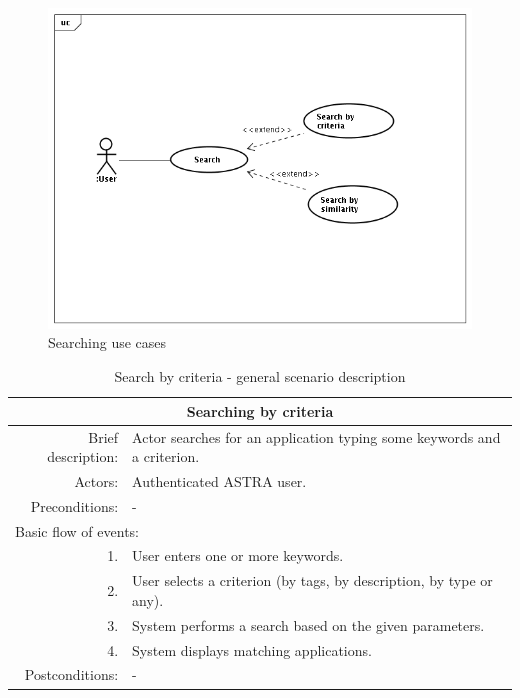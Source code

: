 \begin{figure}[h!]
 \begin{center}
 \includegraphics[scale=0.5]{diagrams/UseCasesDiagram-searching.png}
 \end{center}
 \caption{\label{img:uc-searching}Searching use cases}
\end{figure}

\begin{table}[h!]
	\small
    \begin{center}
		\begin{tabular}{||r|l||}
		\hline \hline
		\multicolumn{2}{||c||}{\bfseries{Searching by criteria}} \\
		\hline
		\hline 
		Brief description: & Actor searches for an application typing some keywords
		and a criterion.\\
		\hline
		Actors: & Authenticated ASTRA user. \\
		\hline
		Preconditions: &  - \\
		\hline \hline
		\multicolumn{2}{||l||}{Basic flow of events:} \\
		\hline \hline
			1. & User enters one or more keywords. \\
			2. & User selects a criterion (by tags, by description, by type or any). \\
			3. & System performs a search based on the given parameters. \\
			4. & System displays matching applications.\\ 
		\hline \hline
		Postconditions: &  - \\
		\hline \hline
		\end{tabular}
		\caption{\label{table:search-criteria}Search by criteria - general scenario
		description}
	\end{center}
\end{table}

